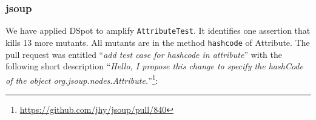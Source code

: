 \documentclass[table,xcdraw,smallextended]{svjour3}
\newcommand{\dspot}{DSpot\xspace}
\begin{document}
% 


\subsubsection{jsoup}

We have applied \dspot to amplify \texttt{AttributeTest}. It identifies one assertion that kills 13 more mutants. All mutants are in the method \texttt{hashcode} of Attribute. The pull request was entitled ``\emph{add test case for hashcode in attribute}'' with the following short description ``\emph{Hello, I propose this change to specify the hashCode of the object org.jsoup.nodes.Attribute.}''\footnote{\url{https://github.com/jhy/jsoup/pull/840}}:
\begin{figure}[H]
    \centering{}
\end{figure}
\end{document}
